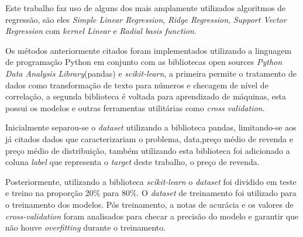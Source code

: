 Este trabalho faz uso de alguns dos mais amplamente utilizados  algoritmos de regressão,
são eles \textit{Simple Linear Regression}, \textit{Ridge Regression}, \textit{Support Vector Regression} com \textit{kernel Linear}
e \textit{Radial basis function}\cite{Price}.

Os métodos anteriormente citados foram implementados utilizando a linguagem de programação Python em conjunto com as bibliotecas open sources
\textit{Python Data Analysis Library}(pandas) e \textit{scikit-learn}, a primeira permite o tratamento de dados  como transformação de texto para números e checagem de nível de correlação,
a segunda biblioteca é voltada para aprendizado de máquinas, esta possui os modelos e outras ferramentas utilitárias como
\textit{cross validation}.

Inicialmente separou-se o \textit{dataset} utilizando a biblioteca pandas, limitando-se aos já citados
dados que caracterizariam o problema, data,preço médio de revenda e preço médio de distribuição, também utilizando esta biblioteca foi adicionado a coluna \textit{label} que representa o \textit{target} deste trabalho, o preço de revenda.

Posteriormente, utilizando a biblioteca \textit{scikit-learn} o \textit{dataset} foi dividido em 
teste e treino na proporção 20\% para 80\%. O \textit{dataset} de treinamento foi utilizado para o
treinamento dos modelos. Pós treinamento, a notas de acurácia e os valores
de \textit{cross-validation} foram analisados para checar a precisão do modelo e garantir que não houve \textit{overfitting} durante o treinamento.
